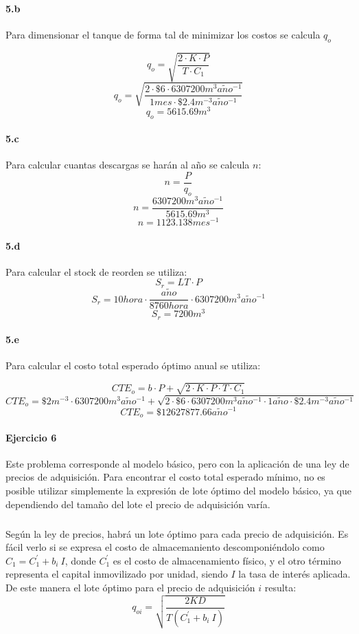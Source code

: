 \documentclass{article}
\def \anio {a\tilde{n}o}
\begin{document}
  \paragraph{5.b}
  Para dimensionar el tanque de forma tal de minimizar los costos se calcula $q_o$
  
  $$q_o = \sqrt{\frac{2 \cdot K \cdot P}{T \cdot C_1}}$$
  $$q_o = \sqrt{\frac{2 \cdot \$6 \cdot 6307200 m^3 \anio^{-1}}{1 mes \cdot \$2.4 m^{-3}\anio^{-1}}} $$
  $$\boxed{q_o = 5615.69 m^3} $$

  \paragraph{5.c}
  Para calcular cuantas descargas se har\'an al a\~no se calcula $n$:
  $$n = \frac{P}{q_o} $$
  $$n = \frac{6307200 m^3 \anio^{-1}}{5615.69 m^3} $$
  $$\boxed{n = 1123.138 mes^{-1}} $$

  \paragraph{5.d}
  Para calcular el stock de reorden se utiliza:
  $$S_r = LT \cdot P $$
  $$S_r = 10 hora \cdot \frac{\anio}{8760 hora} \cdot  6307200 m^3 \anio^{-1} $$
  $$\boxed{S_r = 7200 m^3 }$$
  
  \paragraph{5.e}
  Para calcular el costo total esperado \'optimo anual se utiliza:

  $$CTE_o = b \cdot P + \sqrt{2 \cdot K \cdot P \cdot T \cdot C_1} $$
  $$CTE_o = \$2 m^{-3} \cdot 6307200 m^3 \anio^{-1} + \sqrt{2 \cdot \$6 \cdot 6307200 m^3 \anio^{-1} \cdot 1 \anio \cdot \$2.4 m^{-3}\anio^{-1} }$$
  $$\boxed{CTE_o = \$12627877.66 \anio^{-1}} $$



\pagebreak

\paragraph{Ejercicio 6}
	Este problema corresponde al modelo básico, pero con la aplicación de una ley de precios de adquisición. Para encontrar el costo total esperado mínimo, no es posible utilizar simplemente la expresión de lote óptimo del modelo básico, ya que dependiendo del tamaño del lote el precio de adquisición varía.

	\subparagraph{} Según la ley de precios, habrá un lote óptimo para cada precio de adquisición. Es fácil verlo si se expresa el costo de almacemaniento descomponiéndolo como $C_1 = C_1^{'} + b_i\ I$, donde $C_1^{'}$ es el costo de almacenamiento físico, y el otro término representa el capital inmovilizado por unidad, siendo $I$ la tasa de interés aplicada. De este manera el lote óptimo para el precio de adquisición $ i $ resulta:
	$$ q_{oi} = \sqrt{ \frac{2KD}{T \left( C_1^{'} + b_i\ I \right)} } $$
\end{document}
